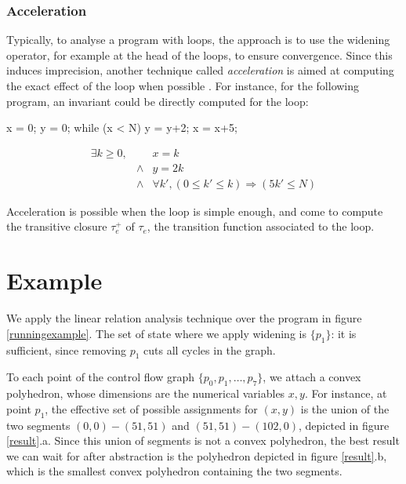 \documentclass[a4paper,english,titlepage,11pt]{report}
\begin{document}
\subsubsection{Acceleration}

Typically, to analyse a program with loops, the approach is to use the
widening operator, for example at the head of the loops, to ensure convergence.
Since this induces imprecision, another technique called \emph{acceleration}
is aimed at computing the exact effect of the loop when possible \cite{Gon07,GH06}. For instance, for
the following program, an invariant could be directly computed for the loop:


\begin{minipage}[c]{.39\linewidth}
\begin{C}
x = 0;
y = 0;
while (x < N) {
	y = y+2;
	x = x+5;
}
\end{C}
\end{minipage} 
\begin{minipage}[c]{.59\linewidth}
$$\begin{array}{llll}
\exists k \geq 0,& & x  = k \\
		&\wedge & y = 2k \\
		&\wedge & \forall k', (0 \leq k' \leq k)
				\Rightarrow (5k' \leq N)
\end{array}$$
\end{minipage}

Acceleration is possible when the loop is simple enough, and come to compute the
transitive closure $\tau_e^+$ of $\tau_e$, the transition function associated to
the loop.

\section{Example}

We apply the linear relation analysis technique over the program in figure
\ref{runningexample}. The set of state where we apply widening is $\{p_1\}$: it
is sufficient, since removing $p_1$ cuts all cycles in the graph.

To each point of the control flow graph $\{p_0, p_1,\dots, p_7\}$, we attach a
convex polyhedron, whose dimensions are the numerical variables $x,y$.
For instance, at point $p_1$, the effective set of possible assignments for
$(x,y)$ is the union of the two segments $(0,0) - (51,51)$ and $(51,51) -
(102,0)$, depicted in figure \ref{result}.a. Since this union of segments is not
a convex polyhedron, the best result we can wait for after abstraction is the
polyhedron depicted in figure \ref{result}.b, which is the smallest convex
polyhedron containing the two segments.
\end{document}
